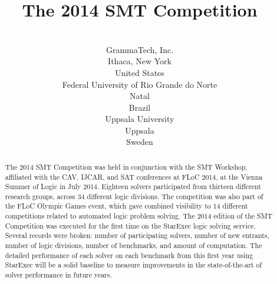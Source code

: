 \documentclass[twoside,11pt]{article}
\newcommand{\comment}[2]{\begin{quote}\sc #1\marginpar{\textcolor{red}{$\ast^{\mbox{#2}}$}}\end{quote}}
\newcommand{\davidc}[1]{\comment{#1}{DC}}
\begin{document}
\title{The 2014 SMT Competition}

\author{
 \\
\addr GrammaTech, Inc. \\
Ithaca, New York\\
United States
\AND
{}
 \\
\addr Federal University of Rio Grande do Norte\\
Natal\\
Brazil 
\AND
{}
 \\
\addr Uppsala University\\
Uppsala\\
 Sweden}

\maketitle

\begin{abstract}
The 2014 SMT Competition was held in conjunction with the SMT Workshop, affiliated with the CAV, IJCAR, and SAT conferences at FLoC 2014, at the Vienna Summer of Logic in July 2014. Eighteen solvers participated from thirteen different research groups, across 34 different logic divisions. The competition was also part of the FLoC Olympic Games event, which gave combined visibility to 14 different competitions related to automated logic problem solving.
The 2014 edition of the SMT Competition was executed for the first time on the StarExec logic solving service. Several records were broken: number of participating solvers, number of new entrants, number of logic divisions, number of benchmarks, and amount of computation. The detailed performance of each solver on each benchmark from this first year using StarExec will be a solid baseline to measure improvements in the state-of-the-art of solver performance in future years.
\end{abstract}



\end{document}
